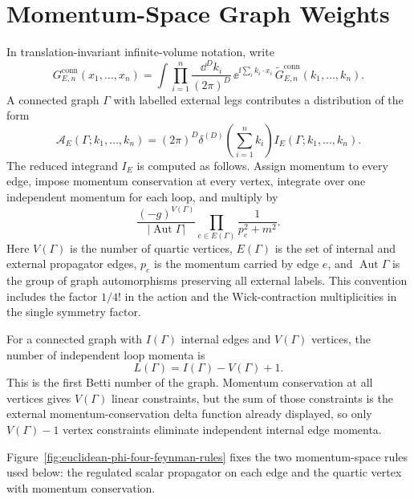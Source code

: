\section{Momentum-Space Graph Weights}

\begin{definition}
\label{def:momentum-space-labelled-euclidean-graph-weight}
In translation-invariant infinite-volume notation, write
\[
  G_{E,n}^{\mathrm{conn}}(x_1,\ldots,x_n)
  =
  \int \prod_{i=1}^n \frac{\dd^D k_i}{(2\pi)^D}\,
  \ee^{\ii\sum_i k_i\cdot x_i}\,
  \widetilde G_{E,n}^{\mathrm{conn}}(k_1,\ldots,k_n).
\]
A connected graph \(\Gamma\) with labelled external legs contributes a
distribution of the form
\[
  \mathcal A_E(\Gamma;k_1,\ldots,k_n)
  =
  (2\pi)^D\delta^{(D)}\!\left(\sum_{i=1}^n k_i\right)
  I_E(\Gamma;k_1,\ldots,k_n).
\]
The reduced integrand \(I_E\) is computed as follows. Assign momentum to every
edge, impose momentum conservation at every vertex, integrate over one
independent momentum for each loop, and multiply by
\[
  \frac{(-g)^{V(\Gamma)}}{|\operatorname{Aut}\Gamma|}
  \prod_{e\in E(\Gamma)}
  \frac{1}{p_e^2+m^2}.
\]
Here \(V(\Gamma)\) is the number of quartic vertices, \(E(\Gamma)\) is the set
of internal and external propagator edges, \(p_e\) is the momentum carried by
edge \(e\), and \(\operatorname{Aut}\Gamma\) is the group of graph
automorphisms preserving all external labels. This convention includes the
factor \(1/4!\) in the action and the Wick-contraction multiplicities in the
single symmetry factor.

For a connected graph with \(I(\Gamma)\) internal edges and \(V(\Gamma)\)
vertices, the number of independent loop momenta is
\[
  L(\Gamma)=I(\Gamma)-V(\Gamma)+1 .
\]
This is the first Betti number of the graph.  Momentum conservation at all
vertices gives \(V(\Gamma)\) linear constraints, but the sum of those
constraints is the external momentum-conservation delta function already
displayed, so only \(V(\Gamma)-1\) vertex constraints eliminate independent
internal edge momenta.
\end{definition}

Figure~\ref{fig:euclidean-phi-four-feynman-rules} fixes the two momentum-space
rules used below: the regulated scalar propagator on each edge and the quartic
vertex with momentum conservation.

